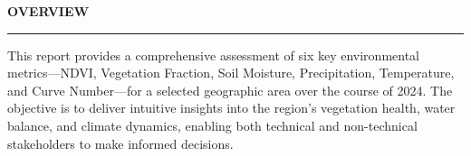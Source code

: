 \documentclass[12pt,a4paper]{article}
\newcommand{\HydroTitle}[1]{%
    {\titlefont\color{hydrosensblue}\bfseries\fontsize{60pt}{40pt}\selectfont #1}
}
\begin{document}
\noindent
\HydroTitle{OVERVIEW}

\vspace{0.3cm}

\vspace{0.5\baselineskip}
\noindent\color{hydrosenscyan}\rule{0.25\textwidth}{3pt}
\vspace{1\baselineskip}

\noindent   
\begingroup
  \contentfont
  \color{black}%
  \normalfont
  \fontsize{16pt}{20pt}\selectfont
This report provides a comprehensive assessment of six key environmental metrics—NDVI, Vegetation Fraction, Soil Moisture, Precipitation, Temperature, and Curve Number—for a selected geographic area over the course of 2024. The objective is to deliver intuitive insights into the region’s vegetation health, water balance, and climate dynamics, enabling both technical and non-technical stakeholders to make informed decisions.
\par
\endgroup

\end{document}
